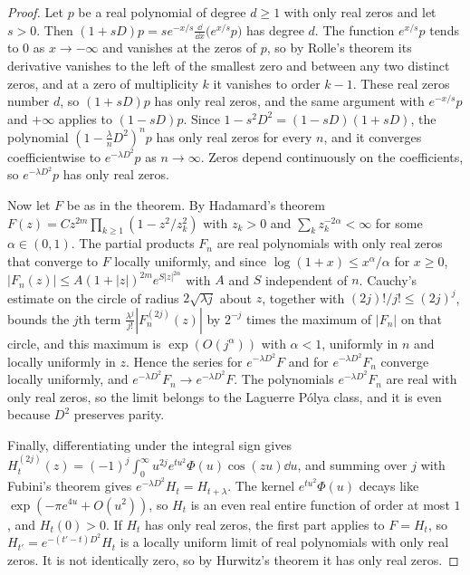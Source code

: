 \begin{proof}
Let $p$ be a real polynomial of degree $d\geq1$ with only real zeros and let $s>0$. Then $(1+sD)p = se^{-x/s}\frac{\dd}{\dd x}\big(e^{x/s}p\big)$ has degree $d$. The function $e^{x/s}p$ tends to $0$ as $x\to-\infty$ and vanishes at the zeros of $p$, so by Rolle's theorem its derivative vanishes to the left of the smallest zero and between any two distinct zeros, and at a zero of multiplicity $k$ it vanishes to order $k-1$. These real zeros number $d$, so $(1+sD)p$ has only real zeros, and the same argument with $e^{-x/s}p$ and $+\infty$ applies to $(1-sD)p$. Since $1-s^2D^2 = (1-sD)(1+sD)$, the polynomial $(1-\frac\lambda nD^2)^np$ has only real zeros for every $n$, and it converges coefficientwise to $e^{-\lambda D^2}p$ as $n\to\infty$. Zeros depend continuously on the coefficients, so $e^{-\lambda D^2}p$ has only real zeros.

Now let $F$ be as in the theorem. By Hadamard's theorem $F(z) = Cz^{2m}\prod_{k\geq1}(1-z^2/z_k^2)$ with $z_k>0$ and $\sum_kz_k^{-2\alpha}<\infty$ for some $\alpha\in(0,1)$. The partial products $F_n$ are real polynomials with only real zeros that converge to $F$ locally uniformly, and since $\log(1+x)\leq x^\alpha/\alpha$ for $x\geq0$, $|F_n(z)|\leq A(1+|z|)^{2m}e^{S|z|^{2\alpha}}$ with $A$ and $S$ independent of $n$. Cauchy's estimate on the circle of radius $2\sqrt{\lambda j}$ about $z$, together with $(2j)!/j!\leq(2j)^j$, bounds the $j$th term $\frac{\lambda^j}{j!}|F_n^{(2j)}(z)|$ by $2^{-j}$ times the maximum of $|F_n|$ on that circle, and this maximum is $\exp(O(j^\alpha))$ with $\alpha<1$, uniformly in $n$ and locally uniformly in $z$. Hence the series for $e^{-\lambda D^2}F$ and for $e^{-\lambda D^2}F_n$ converge locally uniformly, and $e^{-\lambda D^2}F_n\to e^{-\lambda D^2}F$. The polynomials $e^{-\lambda D^2}F_n$ are real with only real zeros, so the limit belongs to the Laguerre P\'olya class, and it is even because $D^2$ preserves parity.

Finally, differentiating under the integral sign gives $H_t^{(2j)}(z) = (-1)^j\int_0^\infty u^{2j}e^{tu^2}\Phi(u)\cos(zu)\dd u$, and summing over $j$ with Fubini's theorem gives $e^{-\lambda D^2}H_t = H_{t+\lambda}$. The kernel $e^{tu^2}\Phi(u)$ decays like $\exp(-\pi e^{4u}+O(u^2))$, so $H_t$ is an even real entire function of order at most $1$, and $H_t(0)>0$. If $H_t$ has only real zeros, the first part applies to $F = H_t$, so $H_{t'} = e^{-(t'-t)D^2}H_t$ is a locally uniform limit of real polynomials with only real zeros. It is not identically zero, so by Hurwitz's theorem it has only real zeros.
\end{proof}

